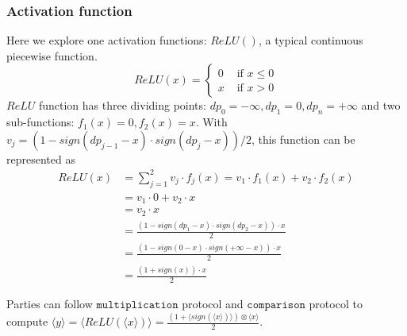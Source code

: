 \documentclass[letterpaper]{article} %
\begin{document}
    \subsubsection{Activation function}
    Here we explore one  activation functions: $ReLU()$, a typical continuous piecewise function.
    $$ReLU(x)=\begin{cases}
        0 & \text{ if } x \leqslant 0  \\
        x & \text{ if } x > 0
        \end{cases}$$
    $ReLU$ function has three dividing points: $dp_{0}= -\infty ,dp_{1}= 0, dp_{n}=+\infty$ and two sub-functions:
    $f_{1}(x)= 0 ,f_{2}(x)= x$.
    With $v_{j} = (1-sign(dp_{j-1}-x)\cdot sign(dp_{j}-x))/2$, this function can be represented as
    \begin{align*}
        ReLU(x)&=\sum_{j=1}^{2}v_{j}\cdot f_{j}(x)=v_{1}\cdot f_{1}(x)+v_{2}\cdot f_{2}(x)\\
        &=v_{1}\cdot 0 +v_{2}\cdot x\\
        &=v_{2}\cdot x\\
        &=\frac{(1-sign(dp_{1}-x)\cdot sign(dp_{2}-x))\cdot x}{2} \\
        &=\frac{(1-sign(0-x)\cdot sign(+\infty -x))\cdot x}{2} \\
        &=\frac{(1+sign(x))\cdot x}{2}
    \end{align*}

    Parties can follow $\mathtt{multiplication}$ protocol and $\mathtt{comparison}$ protocol to compute
    $\langle y\rangle=\langle ReLU(\langle x\rangle)\rangle=\frac{(1+\langle sign(\langle x\rangle)\rangle)\otimes \langle x\rangle}{2}$.
\end{document}
